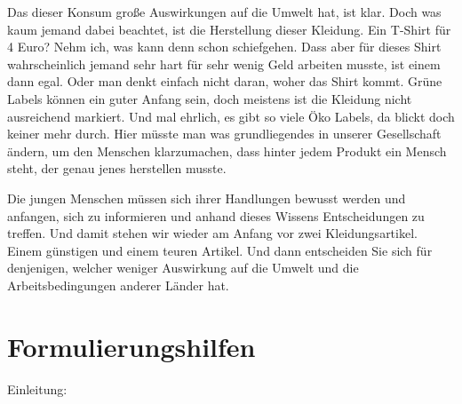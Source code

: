  

Das dieser Konsum große Auswirkungen auf die Umwelt hat, ist klar. Doch was kaum jemand dabei beachtet, ist die Herstellung dieser Kleidung. Ein T-Shirt für 4 Euro? Nehm ich, was kann denn schon schiefgehen. Dass aber für dieses Shirt wahrscheinlich jemand sehr hart für sehr wenig Geld arbeiten musste, ist einem dann egal. Oder man denkt einfach nicht daran, woher das Shirt kommt. Grüne Labels können ein guter Anfang sein, doch meistens ist die Kleidung nicht ausreichend markiert. Und mal ehrlich, es gibt so viele Öko Labels, da blickt doch keiner mehr durch. Hier müsste man was grundliegendes in unserer Gesellschaft ändern, um den Menschen klarzumachen, dass hinter jedem Produkt ein Mensch steht, der genau jenes herstellen musste. 

Die jungen Menschen müssen sich ihrer Handlungen bewusst werden und anfangen, sich zu informieren und anhand dieses Wissens Entscheidungen zu treffen. Und damit stehen wir wieder am Anfang vor zwei Kleidungsartikel. Einem günstigen und einem teuren Artikel. Und dann entscheiden Sie sich für denjenigen, welcher weniger Auswirkung auf die Umwelt und die Arbeitsbedingungen anderer Länder hat. \newpage
\section{Formulierungshilfen}
Einleitung:

